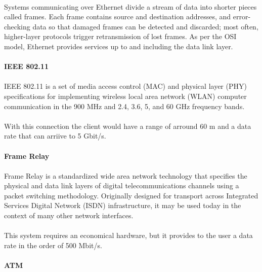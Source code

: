 \paragraph{}
Systems communicating over Ethernet divide a stream of data into shorter pieces called frames. Each frame contains source and destination addresses, and error-checking data so that damaged frames can be detected and discarded; most often, higher-layer protocols trigger retransmission of lost frames. As per the OSI model, Ethernet provides services up to and including the data link layer.

\paragraph{} \textbf{IEEE 802.11}
\paragraph{}
IEEE 802.11 is a set of media access control (MAC) and physical layer (PHY) specifications for implementing wireless local area network (WLAN) computer communication in the 900 MHz and 2.4, 3.6, 5, and 60 GHz frequency bands. 
\paragraph{}
With this connection the client would have a range of arround 60 m and  a data rate that can arriive to 5 Gbit/s.

\paragraph{} \textbf{Frame Relay}
\paragraph{}
Frame Relay is a standardized wide area network technology that specifies the physical and data link layers of digital telecommunications channels using a packet switching methodology. Originally designed for transport across Integrated Services Digital Network (ISDN) infrastructure, it may be used today in the context of many other network interfaces.
\paragraph{}
This system requires an economical hardware, but it provides to the user a data rate in the order of 500 Mbit/s.

\paragraph{} \textbf{ATM}

